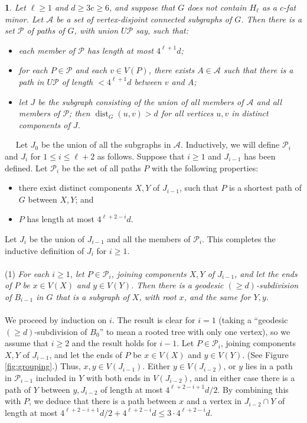 \documentclass[titlepage,11pt]{article}
\newcommand{\dist}{\operatorname{dist}}
\newcommand{\mac}{\mathcal}
\newtheorem{thm}{}[section]
\newcommand{\Proof}{\noindent{\bf Proof.}\ \ }
\begin{document}
	\begin{thm}\label{grouping}
		Let $\ell\ge 1$ and $d\ge 3c\ge 6$, and suppose that $G$ does not contain $H_\ell$ as a $c$-fat minor. Let $\mac A$ be a set of
		vertex-disjoint connected subgraphs of $G$. Then there is a set $\mac P$ of paths of $G$, with union $U\mac P$ say, such that:
		\begin{itemize}
			\item each member of $\mac P$ has length at most $4^{\ell+1} d$;
			\item for each $P\in \mac P$ and each $v\in V(P)$, there exists $A\in \mac A$ such that there is a path in $U\mac P$ of length
			$<4^{\ell+1} d$ between $v$ and $A$; 
			\item let $J$ be the subgraph consisting of the union of all members of $\mac A$ and all members of $\mac P$;
			then $\dist_G(u,v)>d$ for all vertices $u,v$ in distinct components of $J$.
		\end{itemize}
	\end{thm}
	\Proof
	Let $J_0$ be the union of all the subgraphs in $\mac A$. Inductively, we will define $\mac P_i$ and $J_i$ for $1\le i\le \ell+2$ as follows.
	Suppose that $i\ge 1$ and $J_{i-1}$ has been defined. Let $\mac P_i$ be the set of all paths $P$ with the following properties:
	\begin{itemize}
		\item there exist distinct components $X,Y$ of $J_{i-1}$, such that $P$ is a shortest path of $G$ between $X,Y$; and
		\item $P$ has length at most $4^{\ell+2-i}d$.
	\end{itemize}
	Let $J_i$ be the union of $J_{i-1}$ and all the members of $\mac P_i$. This completes the inductive definition of $J_i$ for $i \ge 1$.
	\\
	\\
	(1) {\em For each $i\ge 1$, let $P\in \mac P_i$, joining components $X,Y$ of $J_{i-1}$, and let the ends of $P$ be $x\in V(X)$ and
		$y\in V(Y)$. Then there is a geodesic $(\ge d)$-subdivision of $B_{i-1}$ in $G$ that is a subgraph of $X$, with root $x$, and the same for $Y,y$.}
	\\
	\\
	We proceed by induction on $i$. The result is clear for $i = 1$ (taking a ``geodesic $(\ge d)$-subdivision of $B_0$'' to mean a rooted
	tree with only one vertex), so we assume that $i\ge 2$ and the result holds for $i-1$. Let $P\in \mac P_i$, joining components
	$X,Y$ of $J_{i-1}$, and let the ends of $P$ be $x\in V(X)$ and $y\in V(Y)$. (See Figure \ref{fig:grouping}.) Thus, $x,y\in V(J_{i-1})$.
	Either $y\in V(J_{i-2})$, or $y$ lies in a path
	in $\mac P_{i-1}$ included in $Y$ with both ends in $V(J_{i-2})$, and in either case there is a path of $Y$ between
	$y,J_{i-2}$ of length at most $4^{\ell+2-i+1}d/2$. By combining this with $P$, we deduce that there is a path between $x$ and
	a vertex in $J_{i-2}\cap Y$ of length at most $4^{\ell+2-i+1}d/2+4^{\ell+2-i}d\le 3\cdot 4^{\ell+2-i}d$.
	
\end{document}
